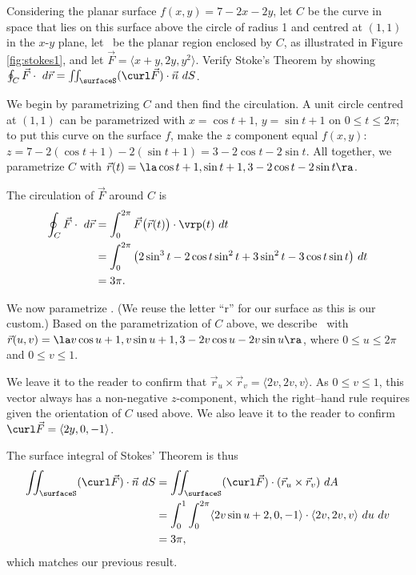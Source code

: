 {Considering the planar surface $f(x,y) = 7-2x-2y$, let $C$ be the curve in space that lies on this surface above the circle of radius 1 and centred at $(1,1)$ in the $x$-$y$ plane, let \surfaceS\ be the planar region enclosed by $C$, as illustrated in Figure \ref{fig:stokes1}, and let $\vec F = \langle x+y,2y, y^2\rangle$. Verify Stoke's Theorem by showing $\oint_C \vec F\cdot \ d\vec r = \iint_\surfaceS (\curl\vec F)\cdot \vec n\ dS$.
}
{We begin by parametrizing $C$ and then find the circulation. A unit circle centred at $(1,1)$ can be parametrized with $x=\cos t+1$, $y=\sin t+1$ on $0\leq t\leq 2\pi$; to put this curve on the surface $f$, make the $z$ component equal $f(x,y)$: $z = 7-2(\cos t+1)-2(\sin t+1)  = 3-2\cos t - 2\sin t$. All together, we parametrize $C$ with $\vec r(t) = \la \cos t+1, \sin t+1, 3-2\cos t-2\sin t\ra$. 
\enlargethispage{3\baselineskip}

The circulation of $\vec F$ around $C$ is
\begin{align*}
\oint_C\vec F\cdot \ d\vec r &= \int_0^{2\pi}\vec F\big(\vec r(t)\big)\cdot \vrp(t)\ dt \\%
	&= \int_0^{2\pi}\big(2\sin^3t-2\cos t\sin^2t+3\sin^2t-3\cos t\sin t\big)\ dt \\
	&= 3\pi.
	\end{align*}

We now parametrize \surfaceS. (We reuse the letter ``r'' for our surface as this is our custom.) Based on the parametrization of $C$ above, we describe \surfaceS\ with $\vec r(u,v) = \la v\cos u+1, v\sin u+1, 3-2v\cos u-2v\sin u\ra$, where $0\leq u\leq 2\pi$ and $0\leq v\leq 1$. 

We leave it to the reader to confirm that $\vec r_u\times \vec r_v = \langle 2v,2v,v\rangle$. As $0\leq v\leq 1$, this vector always has a non-negative $z$-component, which the right--hand rule requires given the orientation of $C$ used above. We also leave it to the reader to confirm $\curl\vec F = \langle 2y,0,-1\rangle$.

The surface integral of Stokes' Theorem is thus
\begin{align*}
\iint_\surfaceS (\curl\vec F)\cdot \vec n\ dS &= \iint_\surfaceS (\curl\vec F)\cdot (\vec r_u\times \vec r_v)\ dA \\
	&= \int_0^1\int_0^{2\pi} \langle 2v\sin u+2,0,-1\rangle\cdot\langle 2v,2v,v\rangle\ du\ dv\\
	&= 3\pi,
\end{align*}
which matches our previous result.
}\\

